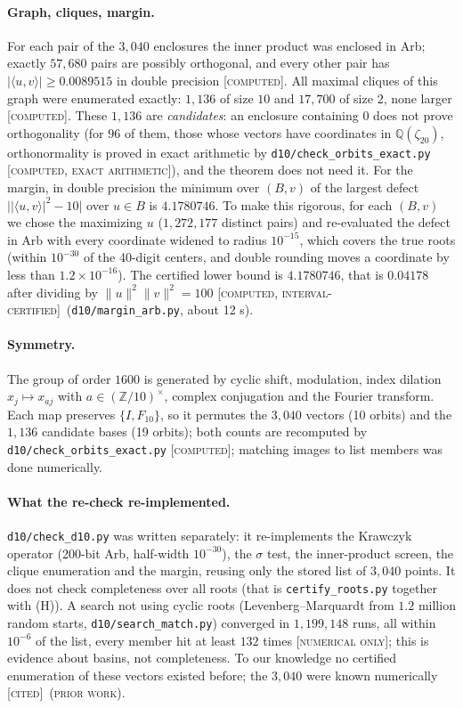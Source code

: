\documentclass[11pt]{article}
\newcommand{\ip}[2]{\langle #1,#2\rangle}
\newcommand{\abs}[1]{\lvert #1\rvert}
\newcommand{\norm}[1]{\lVert #1\rVert}
\newcommand{\st}[1]{\textsc{[#1]}}
\newcommand{\stexact}{\st{computed, exact arithmetic}}
\newcommand{\stcert}{\st{computed, interval-certified}}
\newcommand{\stcomp}{\st{computed}}
\newcommand{\stnum}{\st{numerical only}}
\newcommand{\stcited}{\st{cited}}
\newcommand{\prior}{\textsc{(prior work)}}
\theoremstyle{definition}
\theoremstyle{remark}
\begin{document}
\paragraph{Graph, cliques, margin.} For each pair of the $3{,}040$ enclosures the inner product was enclosed in Arb;
exactly $57{,}680$ pairs are possibly orthogonal, and every other pair has $\abs{\ip uv}\ge0.0089515$ in double precision \stcomp. All
maximal cliques of this graph were enumerated exactly: $1{,}136$ of size $10$ and $17{,}700$ of size $2$, none larger
\stcomp. These $1{,}136$ are \emph{candidates}: an enclosure containing $0$ does not prove orthogonality (for $96$ of
them, those whose vectors have coordinates in $\mathbb{Q}(\zeta_{20})$, orthonormality is proved in exact arithmetic by \texttt{d10/check\_orbits\_exact.py} \stexact),
and the theorem does not need it. For the
margin, in double precision the minimum over $(B,v)$ of the largest defect $\bigl|\abs{\ip uv}^2-10\bigr|$ over $u\in B$
is $4.1780746$. To make this rigorous, for each $(B,v)$ we chose the maximizing $u$ ($1{,}272{,}177$ distinct pairs) and
re-evaluated the defect in Arb with every coordinate widened to radius $10^{-15}$, which covers the true roots
(within $10^{-30}$ of the 40-digit centers, and double rounding moves a coordinate by less than $1.2\times10^{-16}$).
The certified lower bound is $4.1780746$, that is $0.04178$ after dividing by $\norm u^2\norm v^2=100$ \stcert\
(\texttt{d10/margin\_arb.py}, about 12 s).

\paragraph{Symmetry.} The group of order $1600$ is generated by cyclic shift, modulation, index dilation
$x_j\mapsto x_{aj}$ with $a\in(\mathbb{Z}/10)^\times$, complex conjugation and the Fourier transform. Each map preserves
$\{I,F_{10}\}$, so it permutes the $3{,}040$ vectors (10 orbits) and the $1{,}136$ candidate bases (19 orbits); both counts are recomputed by \texttt{d10/check\_orbits\_exact.py} \stcomp; matching images to list members was done numerically.

\paragraph{What the re-check re-implemented.} \texttt{d10/check\_d10.py} was written separately: it re-implements the
Krawczyk operator (200-bit Arb, half-width $10^{-30}$), the $\sigma$ test, the inner-product screen, the clique
enumeration and the margin, reusing only the stored list of $3{,}040$ points. It does not check completeness over all
roots (that is \texttt{certify\_roots.py} together with (H)). A search not using cyclic roots (Levenberg--Marquardt
from $1.2$ million random starts, \texttt{d10/search\_match.py}) converged in $1{,}199{,}148$ runs, all within $10^{-6}$
of the list, every member hit at least $132$ times \stnum; this is evidence about basins, not completeness.
To our knowledge no certified enumeration of these vectors existed before; the $3{,}040$ were known numerically
\cite{FR15} \stcited\ \prior.
\end{document}
